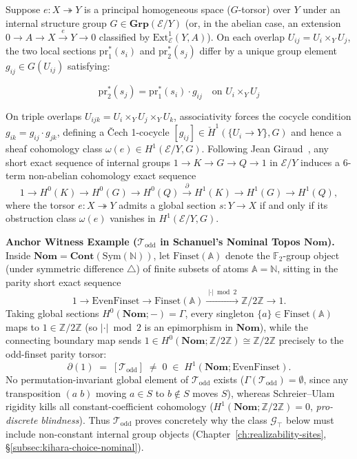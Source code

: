 Suppose $e: X \twoheadrightarrow Y$ is a principal homogeneous space ($G$-torsor) over $Y$ under an internal structure group $G \in \mathbf{Grp}(\mathcal{E}/Y)$ (or, in the abelian case, an extension $0 \to A \to X \xrightarrow{e} Y \to 0$ classified by $\mathrm{Ext}^1_{\mathcal{E}}(Y, A)$). On each overlap $U_{ij} = U_i \times_Y U_j$, the two local sections $\mathrm{pr}_1^*(s_i)$ and $\mathrm{pr}_2^*(s_j)$ differ by a unique group element $g_{ij} \in G(U_{ij})$ satisfying:

\[
  \mathrm{pr}_2^*(s_j) = \mathrm{pr}_1^*(s_i) \cdot g_{ij} \quad \text{on } U_i \times_Y U_j
\]

On triple overlaps $U_{ijk} = U_i \times_Y U_j \times_Y U_k$, associativity forces the cocycle condition $g_{ik} = g_{ij} \cdot g_{jk}$, defining a \v{C}ech 1-cocycle $[g_{ij}] \in \check{H}^1(\{U_i \to Y\}, G)$ and hence a sheaf cohomology class $\omega(e) \in H^1(\mathcal{E}/Y, G)$. Following Jean Giraud~\cite[Chs.~III--IV]{Giraud71}, any short exact sequence of internal groups $1 \to K \to G \to Q \to 1$ in $\mathcal{E}/Y$ induces a $6$-term non-abelian cohomology exact sequence
\[
  1 \longrightarrow H^0(K) \longrightarrow H^0(G) \longrightarrow H^0(Q) \xrightarrow{\;\partial\;} H^1(K) \longrightarrow H^1(G) \longrightarrow H^1(Q),
\]
where the torsor $e: X \twoheadrightarrow Y$ admits a global section $s: Y \to X$ if and only if its obstruction class $\omega(e)$ vanishes in $H^1(\mathcal{E}/Y, G)$.

\medskip
\noindent\textbf{Anchor Witness Example ($\mathcal{T}_{\mathrm{odd}}$ in Schanuel's Nominal Topos $\mathbf{Nom}$).} Inside $\mathbf{Nom} = \mathbf{Cont}(\mathrm{Sym}(\mathbb{N}))$, let $\mathrm{Finset}(\mathbb{A})$ denote the $\mathbb{F}_2$-group object (under symmetric difference $\triangle$) of finite subsets of atoms $\mathbb{A} = \mathbb{N}$, sitting in the parity short exact sequence
\[
  1 \longrightarrow \mathrm{EvenFinset} \longrightarrow \mathrm{Finset}(\mathbb{A}) \xrightarrow{\;|\cdot|\bmod 2\;} \mathbb{Z}/2\mathbb{Z} \longrightarrow 1.
\]
Taking global sections $H^0(\mathbf{Nom}; -) = \Gamma$, every singleton $\{a\} \in \mathrm{Finset}(\mathbb{A})$ maps to $1 \in \mathbb{Z}/2\mathbb{Z}$ (so $|\cdot|\bmod 2$ is an epimorphism in $\mathbf{Nom}$), while the connecting boundary map sends $1 \in H^0(\mathbf{Nom}; \mathbb{Z}/2\mathbb{Z}) \cong \mathbb{Z}/2\mathbb{Z}$ precisely to the odd-finset parity torsor:
\[
  \partial(1) \;=\; [\mathcal{T}_{\mathrm{odd}}] \;\neq\; 0 \;\in\; H^1(\mathbf{Nom}; \mathrm{EvenFinset}).
\]
No permutation-invariant global element of $\mathcal{T}_{\mathrm{odd}}$ exists ($\Gamma(\mathcal{T}_{\mathrm{odd}}) = \emptyset$, since any transposition $(a\; b)$ moving $a \in S$ to $b \notin S$ moves $S$), whereas Schreier--Ulam rigidity kills all constant-coefficient cohomology ($H^1(\mathbf{Nom}; \mathbb{Z}/2\mathbb{Z}) = 0$, \emph{pro-discrete blindness}). Thus $\mathcal{T}_{\mathrm{odd}}$ proves concretely why the class $\mathcal{G}_{\top}$ below must include non-constant internal group objects (Chapter~\ref{ch:realizability-sites}, \S\ref{subsec:kihara-choice-nominal}).

